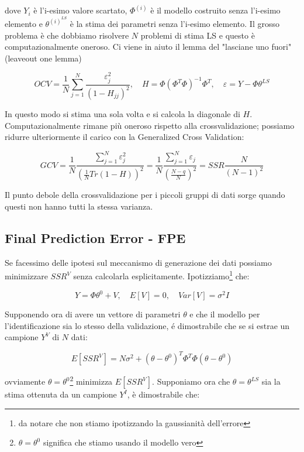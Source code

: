 dove $Y_i$ è l'i-esimo valore scartato, $\Phi^{(i)}$ è il modello costruito senza l'i-esimo elemento e $\theta^{(i)^{LS}}$ è la stima dei parametri senza l'i-esimo elemento.\newline
Il grosso problema è che dobbiamo risolvere $N$ problemi di stima LS e questo è computazionalmente oneroso. Ci viene in aiuto il lemma del "lasciane uno fuori" (leaveout one lemma)

    \[ OCV=\frac{1}{N}\sum_{j=1}^{N}\frac{\varepsilon_j^2}{(1-H_{jj})^2}, \quad  H=\Phi(\Phi^T\Phi)^{-1}\Phi^T,  \quad  \varepsilon=Y-\Phi\theta^{LS} \]

In questo modo si stima una sola volta e si calcola la diagonale di $H$. Computazionalmente rimane più oneroso rispetto alla crossvalidazione; possiamo ridurre ulteriormente il carico con la Generalized Cross Validation:

    \[ GCV=\frac{1}{N}\frac{\sum_{j=1}^{N}{\varepsilon_j^2}}{(\frac{1}{N}Tr(1-H))^2}=\frac{1}{N}\frac{\sum_{j=1}^{N}{\varepsilon_j}}{(\frac{N-q}{N})^2}=SSR\frac{N}{(N-1)^2} \]

Il punto debole della crossvalidazione per i piccoli gruppi di dati sorge quando questi non hanno tutti la stessa varianza.
\subsection{Final Prediction Error - FPE}
Se facessimo delle ipotesi sul meccanismo di generazione dei dati possiamo minimizzare $SSR^V$ senza calcolarla esplicitamente. Ipotizziamo\footnote{da notare che non stiamo ipotizzando la gaussianità dell'errore} che:

    \[ Y=\Phi\theta^0+V,\quad E[V]=0,\quad  Var[V]=\sigma^2 I \]

Supponendo ora di avere un vettore di parametri $\theta$ e che il modello per l'identificazione sia lo stesso della validazione, é dimostrabile che se si estrae un campione $Y^V$ di $N$ dati:

    \[ E[SSR^V]=N \sigma^2+(\theta-\theta^0)^T\Phi^T\Phi(\theta-\theta^0) \]

ovviamente $\theta=\theta^0$\footnote{$\theta=\theta^0$ significa che stiamo usando il modello vero} minimizza $E[SSR^V]$. Supponiamo ora che $\theta=\theta^{LS}$ sia la stima ottenuta da un campione $Y^I$, è dimostrabile che:


